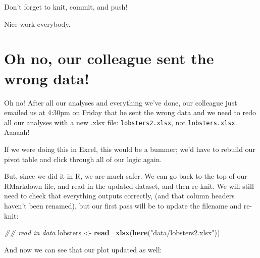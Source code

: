 \documentclass[]{book}
\newenvironment{Shaded}{\begin{snugshade}}{\end{snugshade}}
\newcommand{\CommentTok}[1]{\textcolor[rgb]{0.56,0.35,0.01}{\textit{#1}}}
\newcommand{\DataTypeTok}[1]{\textcolor[rgb]{0.13,0.29,0.53}{#1}}
\newcommand{\KeywordTok}[1]{\textcolor[rgb]{0.13,0.29,0.53}{\textbf{#1}}}
\newcommand{\NormalTok}[1]{#1}
\newcommand{\OperatorTok}[1]{\textcolor[rgb]{0.81,0.36,0.00}{\textbf{#1}}}
\newcommand{\OtherTok}[1]{\textcolor[rgb]{0.56,0.35,0.01}{#1}}
\newcommand{\StringTok}[1]{\textcolor[rgb]{0.31,0.60,0.02}{#1}}
\begin{document}
Don't forget to knit, commit, and push!

Nice work everybody.

\hypertarget{oh-no-our-colleague-sent-the-wrong-data}{%
\section{Oh no, our colleague sent the wrong data!}\label{oh-no-our-colleague-sent-the-wrong-data}}

Oh no! After all our analyses and everything we've done, our colleague just emailed us at 4:30pm on Friday that he sent the wrong data and we need to redo all our analyses with a new .xlsx file: \texttt{lobsters2.xlsx}, not \texttt{lobsters.xlsx}. Aaaaah!

If we were doing this in Excel, this would be a bummer; we'd have to rebuild our pivot table and click through all of our logic again.

But, since we did it in R, we are much safer. We can go back to the top of our RMarkdown file, and read in the updated dataset, and then re-knit. We will still need to check that everything outputs correctly, (and that column headers haven't been renamed), but our first pass will be to update the filename and re-knit:

\begin{Shaded}
\begin{Highlighting}[]
\CommentTok{## read in data}
\NormalTok{lobsters <-}\StringTok{ }\KeywordTok{read_xlsx}\NormalTok{(}\KeywordTok{here}\NormalTok{(}\StringTok{"data/lobsters2.xlsx"}\NormalTok{))}
\end{Highlighting}
\end{Shaded}

And now we can see that our plot updated as well:

\begin{Shaded}
\end{Shaded}
\end{document}
